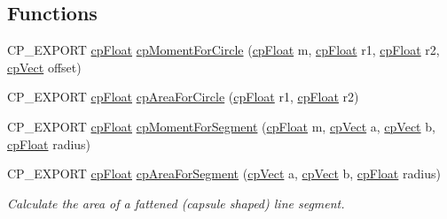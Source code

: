 \subsection*{Functions}
\begin{DoxyCompactItemize}
\item 
C\+P\+\_\+\+E\+X\+P\+O\+RT \mbox{\hyperlink{group__basic_types_gac1ed65573e035bf892505768c852d8d3}{cp\+Float}} \mbox{\hyperlink{group__misc_gafa2103fb2fd788fded1131e53f00681a}{cp\+Moment\+For\+Circle}} (\mbox{\hyperlink{group__basic_types_gac1ed65573e035bf892505768c852d8d3}{cp\+Float}} m, \mbox{\hyperlink{group__basic_types_gac1ed65573e035bf892505768c852d8d3}{cp\+Float}} r1, \mbox{\hyperlink{group__basic_types_gac1ed65573e035bf892505768c852d8d3}{cp\+Float}} r2, \mbox{\hyperlink{structcp_vect}{cp\+Vect}} offset)
\item 
C\+P\+\_\+\+E\+X\+P\+O\+RT \mbox{\hyperlink{group__basic_types_gac1ed65573e035bf892505768c852d8d3}{cp\+Float}} \mbox{\hyperlink{group__misc_ga55a50f3dfa695db703759e550db16bce}{cp\+Area\+For\+Circle}} (\mbox{\hyperlink{group__basic_types_gac1ed65573e035bf892505768c852d8d3}{cp\+Float}} r1, \mbox{\hyperlink{group__basic_types_gac1ed65573e035bf892505768c852d8d3}{cp\+Float}} r2)
\item 
C\+P\+\_\+\+E\+X\+P\+O\+RT \mbox{\hyperlink{group__basic_types_gac1ed65573e035bf892505768c852d8d3}{cp\+Float}} \mbox{\hyperlink{group__misc_ga9548fe7830d426bde625d39d4687e6be}{cp\+Moment\+For\+Segment}} (\mbox{\hyperlink{group__basic_types_gac1ed65573e035bf892505768c852d8d3}{cp\+Float}} m, \mbox{\hyperlink{structcp_vect}{cp\+Vect}} a, \mbox{\hyperlink{structcp_vect}{cp\+Vect}} b, \mbox{\hyperlink{group__basic_types_gac1ed65573e035bf892505768c852d8d3}{cp\+Float}} radius)
\item 
\mbox{\label{group__misc_ga5758bdfd93aec5d3f3780a1ff29aad37}} 
C\+P\+\_\+\+E\+X\+P\+O\+RT \mbox{\hyperlink{group__basic_types_gac1ed65573e035bf892505768c852d8d3}{cp\+Float}} \mbox{\hyperlink{group__misc_ga5758bdfd93aec5d3f3780a1ff29aad37}{cp\+Area\+For\+Segment}} (\mbox{\hyperlink{structcp_vect}{cp\+Vect}} a, \mbox{\hyperlink{structcp_vect}{cp\+Vect}} b, \mbox{\hyperlink{group__basic_types_gac1ed65573e035bf892505768c852d8d3}{cp\+Float}} radius)
\begin{DoxyCompactList}\small\item\em Calculate the area of a fattened (capsule shaped) line segment. \end{DoxyCompactList}\item 

\end{DoxyCompactItemize}
